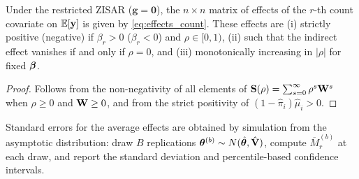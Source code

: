\begin{proposition}\label{prop:effects}
Under the restricted ZISAR ($\mathbf{g}=\mathbf{0}$), the $n \times n$ matrix of effects of the $r$-th count covariate on $\mathbb{E}[\mathbf{y}]$ is given by \eqref{eq:effects_count}.
These effects are (i) strictly positive (negative) if $\beta_r > 0$ ($\beta_r < 0$) and $\rho \in [0,1)$, (ii) such that the indirect effect vanishes if and only if $\rho = 0$, and (iii) monotonically increasing in $|\rho|$ for fixed $\boldsymbol{\beta}$.
\end{proposition}

\begin{proof}
Follows from the non-negativity of all elements of $\mathbf{S}(\rho) = \sum_{s=0}^{\infty}\rho^s\mathbf{W}^s$ when $\rho \geq 0$ and $\mathbf{W} \geq 0$, and from the strict positivity of $(1-\hat{\pi}_i)\hat{\mu}_i > 0$.
\end{proof}

Standard errors for the average effects are obtained by simulation from the asymptotic distribution: draw $B$ replications $\boldsymbol{\theta}^{(b)} \sim N(\hat{\boldsymbol{\theta}}, \hat{\mathbf{V}})$, compute $\overline{M}_r^{(b)}$ at each draw, and report the standard deviation and percentile-based confidence intervals.
